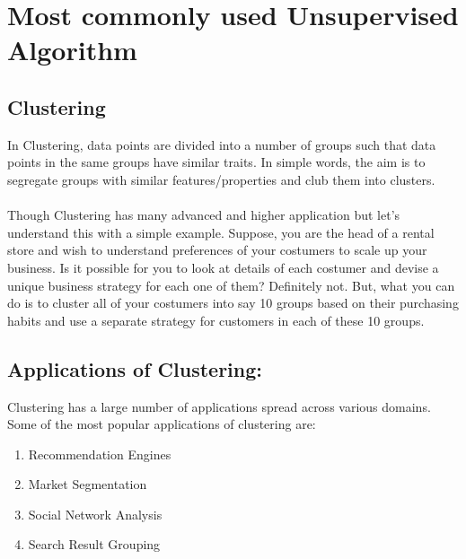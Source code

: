 \documentclass[Proceedings]{ascelike}
\begin{document}
\section{Most commonly used Unsupervised Algorithm}
\subsection{Clustering}

In Clustering, data points are divided into a number of groups such that data points in the same groups have similar traits. In simple words, the aim is to segregate groups with similar features/properties and club them into clusters.\\
\\Though Clustering has many advanced and higher application but let’s understand this with a simple example. Suppose, you are the head of a rental store and wish to understand preferences of your costumers to scale up your business. Is it possible for you to look at details of each costumer and devise a unique business strategy for each one of them? Definitely not. But, what you can do is to cluster all of your costumers into say 10 groups based on their purchasing habits and use a separate strategy for customers in each of these 10 groups.\\

\subsection{Applications of Clustering:}


Clustering has a large number of applications spread across various domains. Some of the most popular applications of clustering are:
\begin{enumerate}
	\item Recommendation Engines
	\item Market Segmentation
	\item Social Network Analysis
	\item Search Result Grouping
\end{enumerate}
\end{document}
